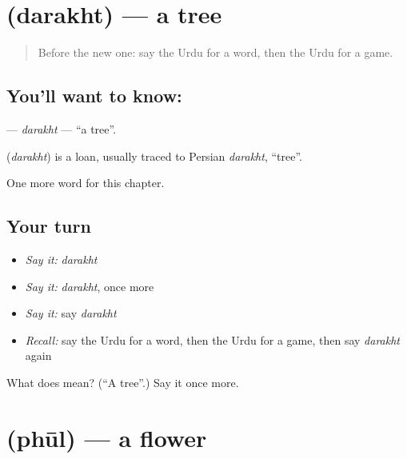 \section[\texorpdfstring{\ur{درخت} (darakht)}{درخت (darakht)}]{ (darakht) — a tree}

\label{lesson:UR-C63-darakht}



\begin{quote}
Before the new one: say the Urdu for a word, then the Urdu for a game.
\end{quote}

\subsection*{You'll want to know: }
\textbf{} — \emph{darakht} — \textquotedblleft{}a tree\textquotedblright{}.

\begin{cousinweb}
\textbf{} (\emph{darakht}) is a loan, usually traced to Persian \emph{darakht}, \textquotedblleft{}tree\textquotedblright{}.
\end{cousinweb}

\begin{grammarlens}[title={What you've built}]
One more word for this chapter.
\end{grammarlens}

\subsection*{Your turn}
\begin{itemize}
\raggedright
  \item \emph{Say it:} \emph{darakht}
  \item \emph{Say it:} \emph{darakht}, once more
  \item \emph{Say it:} say \emph{darakht}
  \item \emph{Recall:} say the Urdu for a word, then the Urdu for a game, then say \emph{darakht} again
\end{itemize}

\begin{tcolorbox}[breakable,colback=teal!4,colframe=teal!35!black,title={Before you move on}]
What does  mean? (\textquotedblleft{}A tree\textquotedblright{}.) Say it once more.
\end{tcolorbox}
\section[\texorpdfstring{\ur{پھول} (phūl)}{پھول (phūl)}]{ (phūl) — a flower}

